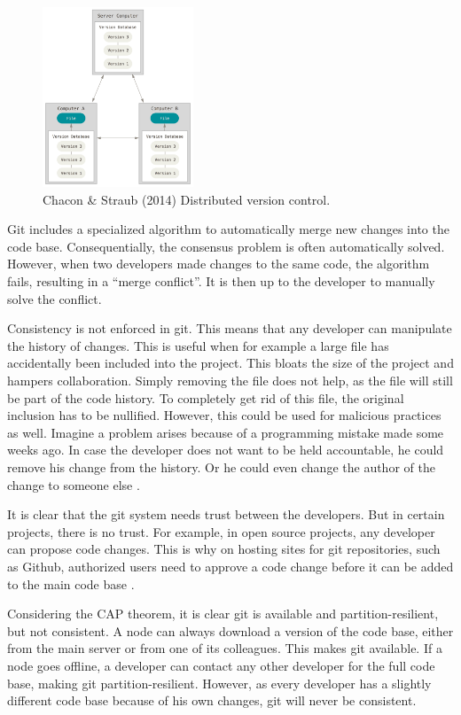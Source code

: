 \begin{figure}[h]
\centering
\includegraphics[width=0.4\textwidth]{paper-images/distributed.png}
\caption{Chacon \& Straub (2014) Distributed version control.} 
\label{fig:distributed-vcs}
\end{figure}

Git includes a specialized algorithm to automatically merge new changes into the code base. Consequentially, the consensus problem is often automatically solved. However, when two developers made changes to the same code, the algorithm fails, resulting in a ``merge conflict''. It is then up to the developer to manually solve the conflict. 

Consistency is not enforced in git. This means that any developer can manipulate the history of changes. This is useful when for example a large file has accidentally been included into the project. This bloats the size of the project and hampers collaboration. Simply removing the file does not help, as the file will still be part of the code history. To completely get rid of this file, the original inclusion has to be nullified. However, this could be used for malicious practices as well. Imagine a problem arises because of a programming mistake made some weeks ago. In case the developer does not want to be held accountable, he could remove his change from the history. Or he could even change the author of the change to someone else \cite{change-author-commit}.

It is clear that the git system needs trust between the developers. But in certain projects, there is no trust. For example, in open source projects, any developer can propose code changes. This is why on hosting sites for git repositories, such as Github, authorized users need to approve a code change before it can be added to the main code base \cite{github-pr}. 

Considering the CAP theorem, it is clear git is available and partition-resilient, but not consistent. A node can always download a version of the code base, either from the main server or from one of its colleagues. This makes git available. If a node goes offline, a developer can contact any other developer for the full code base, making git partition-resilient. However, as every developer has a slightly different code base because of his own changes, git will never be consistent.

